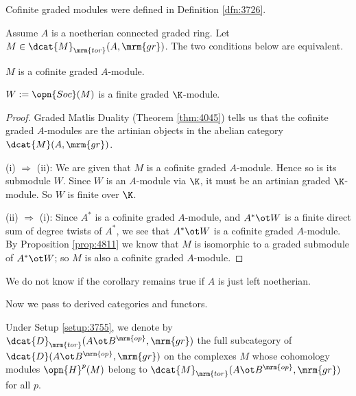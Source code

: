 Cofinite graded modules were defined in Definition \ref{dfn:3726}. 

\begin{cor} \label{cor:4270}
Assume $A$ is a noetherian connected graded ring. Let 
$M \in \dcat{M}_{\mrm{tor}}(A, \mrm{gr})$. 
The two conditions below are equivalent.
\begin{enumerate}
 $M$ is a cofinite graded $A$-module.  

 $W := \opn{Soc}(M)$ is a finite graded $\K$-module.
\end{enumerate}
\end{cor}

\begin{proof}
Graded Matlis Duality (Theorem \ref{thm:4045}) tells us that 
the cofinite graded $A$-modules are the artinian objects in the abelian 
category $\dcat{M}(A, \mrm{gr})$. 

\medskip \noindent 
(i) $\Rightarrow$ (ii): We are given that $M$ is a cofinite graded $A$-module. 
Hence so is its submodule $W$. Since $W$ is an 
$A$-module via $\K$, it must be an artinian graded $\K$-module. So 
$W$ is finite over $\K$. 

\medskip \noindent 
(ii) $\Rightarrow$ (i): Since $A^*$ is a cofinite graded $A$-module, and 
$A^* \ot W$ is a finite direct sum of degree twists of $A^*$,
we see that $A^* \ot W$ is a cofinite graded $A$-module. By Proposition 
\ref{prop:4811} we know that $M$ is isomorphic to a graded submodule of 
$A^* \ot W$; so $M$ is also a cofinite graded $A$-module.
\end{proof}

\begin{rem} \label{rem:4270}
We do not know if the corollary remains true if $A$ is just left noetherian. 
\end{rem}

Now we pass to derived categories and functors. 

\begin{dfn} \label{dfn:3755}
Under Setup \ref{setup:3755}, we denote by 
$\dcat{D}_{\mrm{tor}}(A \ot B^{\mrm{op}}, \mrm{gr})$
the full subcategory of 
$\dcat{D}(A \ot B^{\mrm{op}}, \mrm{gr})$
on the complexes $M$ whose cohomology modules $\opn{H}^p(M)$
belong to $\dcat{M}_{\mrm{tor}}(A \ot B^{\mrm{op}}, \mrm{gr})$
for all $p$.
\end{dfn}

